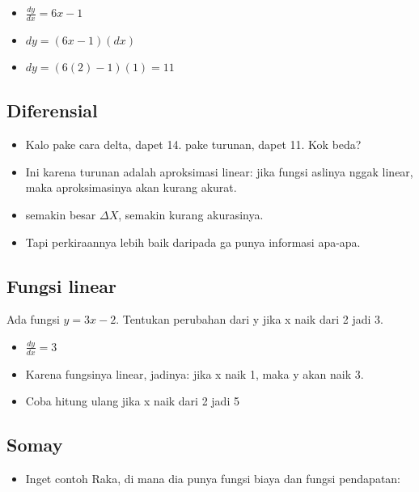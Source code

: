 \documentclass[
  letterpaper,
  DIV=11,
  numbers=noendperiod]{scrartcl}
\providecommand{\tightlist}{%
  \setlength{\itemsep}{0pt}\setlength{\parskip}{0pt}}\usepackage{longtable,booktabs,array}
\begin{document}
\begin{itemize}
\item
  \(\frac{dy}{dx}=6x-1\)
\item
  \(dy=(6x-1)(dx)\)
\item
  \(dy=(6(2)-1)(1)=11\)
\end{itemize}

\hypertarget{diferensial-1}{%
\subsection{Diferensial}\label{diferensial-1}}

\begin{itemize}
\item
  Kalo pake cara delta, dapet 14. pake turunan, dapet 11. Kok beda?
\item
  Ini karena turunan adalah aproksimasi linear: jika fungsi aslinya
  nggak linear, maka aproksimasinya akan kurang akurat.
\item
  semakin besar \(\Delta X\), semakin kurang akurasinya.
\item
  Tapi perkiraannya lebih baik daripada ga punya informasi apa-apa.
\end{itemize}

\hypertarget{fungsi-linear-4}{%
\subsection{Fungsi linear}\label{fungsi-linear-4}}

Ada fungsi \(y=3x-2\). Tentukan perubahan dari y jika x naik dari 2 jadi
3.

\begin{itemize}
\item
  \(\frac{dy}{dx}=3\)
\item
  Karena fungsinya linear, jadinya: jika x naik 1, maka y akan naik 3.
\item
  Coba hitung ulang jika x naik dari 2 jadi 5
\end{itemize}

\hypertarget{somay}{%
\subsection{Somay}\label{somay}}

\begin{itemize}
\tightlist
\item
  Inget contoh Raka, di mana dia punya fungsi biaya dan fungsi
  pendapatan:
\end{itemize}
\end{document}
